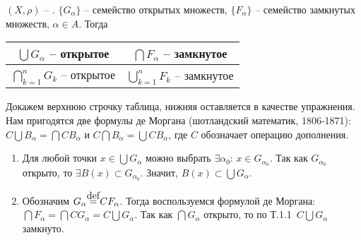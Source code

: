 \begin{Theorem} \label{thm:thm_1_2}
$(X, \rho)$ -- \MS. $\{G_{\alpha}\}$ -- семейство открытых множеств, $\{F_{\alpha}\}$ -- семейство замкнутых множеств, $\alpha \in A$. Тогда
\begin{center}
    \begin{tabular}{ |c|c| }
        \hline
        $\bigcup G_{\alpha}$ -- открытое & $\bigcap F_{\alpha}$ -- замкнутое \\[0.2cm]
        \hline
        $\bigcap\limits_{k=1}^n G_k$ -- открытое & $\bigcup\limits_{k=1}^n F_k$ -- замкнутое \\
        \hline
    \end{tabular}
    \end{center}
\end{Theorem}
\begin{Proof}
    Докажем верхнюю строчку таблица, нижняя оставляется в качестве упражнения. Нам пригодятся две формулы де Моргана (шотландский математик, 1806-1871): 
    $C \bigcup B_{\alpha} = \bigcap CB_{\alpha}$ и $C \bigcap B_{\alpha} = \bigcup CB_{\alpha}$, где $C$ обозначает операцию дополнения.
    \begin{enumerate}
        \item Для любой точки $x \in \bigcup G_{\alpha}$ можно выбрать $\exists \alpha_0:\, x \in G_{\alpha_0}$. Так как $G_{\alpha_0}$ открыто, то $\exists B(x) \subset G_{\alpha_0}$. Значит, $B(x) \subset \bigcup G_{\alpha}$.
        \item Обозначим $G_{\alpha} \defeq CF_{\alpha}$. Тогда воспользуемся формулой де Моргана: $\bigcap F_{\alpha} = \bigcap CG_{\alpha} = C \bigcup G_{\alpha}$. Так как $\bigcap G_{\alpha}$ открыто, то по Т.1.1 $\, C \bigcup G_{\alpha}$ замкнуто.
    \end{enumerate}
\end{Proof}

